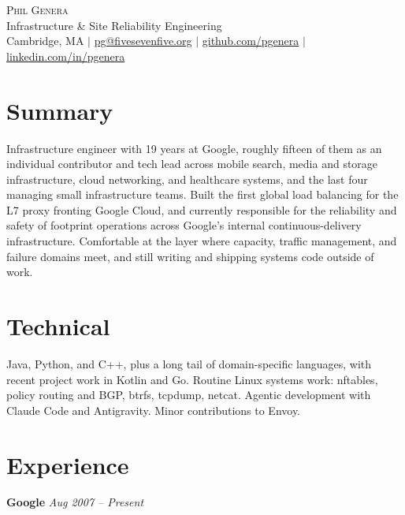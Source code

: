 \documentclass[10.5pt]{article}
\begin{document}
\begin{center}
  {\Large \scshape Phil Genera}\\[3pt]
  Infrastructure \& Site Reliability Engineering\\[2pt]
  \small Cambridge, MA $\vert$
  \href{mailto:pg@fivesevenfive.org}{pg@fivesevenfive.org} $\vert$
  \href{https://github.com/pgenera}{github.com/pgenera} $\vert$
  \href{https://www.linkedin.com/in/pgenera}{linkedin.com/in/pgenera}
\end{center}

\section*{Summary}
Infrastructure engineer with 19 years at Google, roughly fifteen of them as an individual
contributor and tech lead across mobile search, media and storage infrastructure, cloud
networking, and healthcare systems, and the last four managing small infrastructure teams.
Built the first global load balancing for the L7 proxy fronting Google Cloud, and currently
responsible for the reliability and safety of footprint operations across Google's internal
continuous-delivery infrastructure. Comfortable at the layer where capacity, traffic
management, and failure domains meet, and still writing and shipping systems code outside
of work.

\section*{Technical}
Java, Python, and C++, plus a long tail of domain-specific languages, with recent project work in
Kotlin and Go. Routine Linux systems work: nftables, policy routing and BGP, btrfs, tcpdump,
netcat. Agentic development with Claude Code and Antigravity. Minor contributions to Envoy.

\section*{Experience}

\textbf{Google} \hfill \textit{Aug 2007 -- Present}
\end{document}
